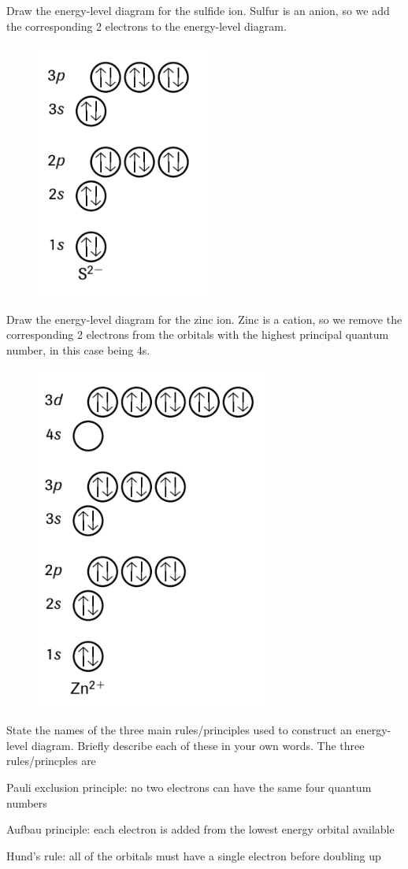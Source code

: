 \begin{sample}{Draw the energy-level diagram for the sulfide ion.}
    Sulfur is an anion, so we add the corresponding 2 electrons to the energy-level diagram.
    \begin{figure}[ht!]
        \centering
        \includegraphics[width=0.15 \textwidth]{../figures/energy-level-diagram-sulfide-ion.png}
    \end{figure}
\end{sample}

\begin{sample}{Draw the energy-level diagram for the zinc ion.}
    Zinc is a cation, so we remove the corresponding 2 electrons from the orbitals with the highest
    principal quantum number, in this case being 4s.
    \begin{figure}[ht!]
        \centering
        \includegraphics[width=0.15 \textwidth]{../figures/energy-levecl-diagram-zinc-ion.png}
    \end{figure}
\end{sample}

\begin{sample}{State the names of the three main rules/principles used to construct an energy-level
    diagram. Briefly describe each of these in your own words.}
    The three rules/princples are
    \begin{enum-alph}
        \item Pauli exclusion principle: no two electrons can have the same four quantum numbers
        \item Aufbau principle: each electron is added from the lowest energy orbital available
        \item Hund's rule: all of the orbitals must have a single electron before doubling up
    \end{enum-alph}
\end{sample}

